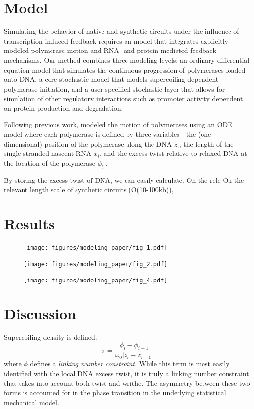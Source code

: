 \documentclass[11pt]{article}
\begin{document}
\section{Model}
Simulating the behavior of native and synthetic circuits under the influence of transcription-induced feedback requires an model that integrates explicitly-modeled polymerase motion and RNA- and protein-mediated feedback mechanisms.
Our method combines three modeling levels: an ordinary differential equation model that simulates the continuous progression of polymerases loaded onto DNA, a core stochastic model that models supercoiling-dependent polymerase initiation, and a user-specified stochastic layer that allows for simulation of other regulatory interactions such as promoter activity dependent on protein production and degradation.

Following previous work, modeled the motion of polymerases using an ODE model where each polymerase is defined by three variables---the (one-dimensional) position of the polymerase along the DNA \(z_i\), the length of the single-stranded nascent RNA \(x_i\), and the excess twist relative to relaxed DNA at the location of the polymerase \(\phi_i\) \parencite{markoTorqueDynamicsLinking2007,sevierPropertiesGeneExpression2018}.

By storing the excess twist of DNA, we can easily calculate. On the rele
On the relevant length scale of synthetic circuits (O(10-100kb)),

\section{Results}

\begin{figure}[h]
    \centering
    \texttt{[image: figures/modeling\_paper/fig\_1.pdf]}
    \caption{}
\end{figure}
\begin{figure}[h]
    \centering
    \texttt{[image: figures/modeling\_paper/fig\_2.pdf]}
    \caption{}
\end{figure}
\begin{figure}[h]
    \centering
    \texttt{[image: figures/modeling\_paper/fig\_4.pdf]}
    \caption{}
\end{figure}

\section{Discussion}

Supercoiling density is defined:
\begin{equation}
    \sigma = \frac{\phi_i - \phi_{i - 1}}{\omega_0 | z_{i} - z_{i-1}|}
    \label{eq:sc_density}
\end{equation}
where \(\phi\) defines a \emph{linking number constraint}. While this term is most easily identified with the local DNA excess twist, it is truly a linking number constraint that takes into account both twist and writhe. The asymmetry between these two forms is accounted for in the phase transition in the underlying statistical mechanical model.
\end{document}
